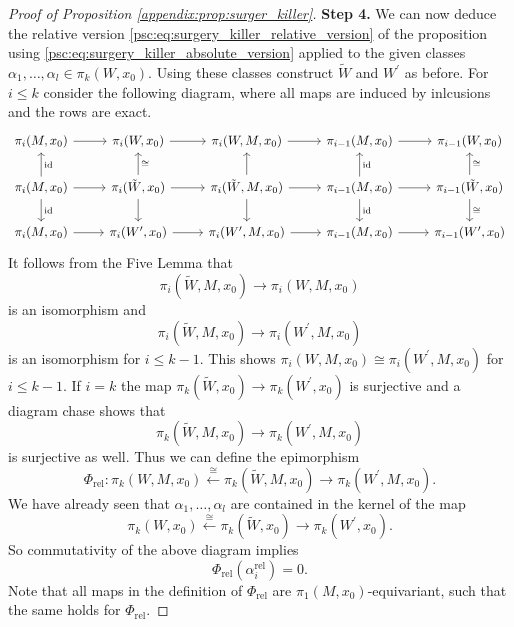 \begin{proof}[Proof of Proposition \ref{appendix:prop:surger_killer}]
    \noindent \textbf{Step 4.} We can now deduce the relative version \ref{psc:eq:surgery_killer_relative_version} of the proposition using \ref{psc:eq:surgery_killer_absolute_version} applied to the given classes $\alpha_1, \ldots, \alpha_l \in \pi_k(W,x_0)$. Using these classes construct $\tilde{W}$ and $W^\prime$ as before. For $i \leq k$ consider the following diagram, where all maps are induced by inlcusions and the rows are exact. 
    \[\begin{tikzcd}
	{\pi_i(M,x_0)} & {\pi_i(W,x_0)} & {\pi_i(W,M,x_0)} & {\pi_{i-1}(M,x_0)} & {\pi_{i-1}(W,x_0)} \\
	{\pi_i(M,x_0)} & {\pi_i(\tilde{W},x_0)} & {\pi_i(\tilde{W},M,x_0)} & {\pi_{i-1}(M,x_0)} & {\pi_{i-1}(\tilde{W},x_0)} \\
	{\pi_i(M,x_0)} & {\pi_i(W^\prime,x_0)} & {\pi_i(W^\prime,M,x_0)} & {\pi_{i-1}(M,x_0)} & {\pi_{i-1}(W^\prime,x_0)}
	\arrow[from=1-1, to=1-2]
	\arrow[from=1-2, to=1-3]
	\arrow[from=1-3, to=1-4]
	\arrow[from=1-4, to=1-5]
	\arrow["{\mathrm{id}}"', from=2-1, to=1-1]
	\arrow[from=2-1, to=2-2]
	\arrow["{\mathrm{id}}", from=2-1, to=3-1]
	\arrow["\cong"', from=2-2, to=1-2]
	\arrow[from=2-2, to=2-3]
	\arrow[from=2-2, to=3-2]
	\arrow[from=2-3, to=1-3]
	\arrow[from=2-3, to=2-4]
	\arrow[from=2-3, to=3-3]
	\arrow["{\mathrm{id}}"', from=2-4, to=1-4]
	\arrow[from=2-4, to=2-5]
	\arrow["{\mathrm{id}}", from=2-4, to=3-4]
	\arrow["\cong"', from=2-5, to=1-5]
	\arrow["\cong", from=2-5, to=3-5]
	\arrow[from=3-1, to=3-2]
	\arrow[from=3-2, to=3-3]
	\arrow[from=3-3, to=3-4]
	\arrow[from=3-4, to=3-5]
    \end{tikzcd}\]
    It follows from the Five Lemma that 
    \[
    \pi_i(\tilde{W},M,x_0) \to \pi_i(W,M,x_0)
    \] 
    is an isomorphism and 
    \[
    \pi_i(\tilde{W},M,x_0) \to \pi_i(W^\prime,M,x_0)
    \] 
    is an isomorphism for $i \leq k-1$. This shows $\pi_i(W,M,x_0) \cong \pi_i(W^\prime,M,x_0)$ for $i \leq k-1$. If $i = k$ the map $\pi_k(\tilde{W},x_0) \to \pi_k(W^\prime,x_0)$ is surjective and a diagram chase shows that 
    \[
    \pi_k(\tilde{W},M,x_0) \to \pi_k(W^\prime,M,x_0)
    \] 
    is surjective as well. Thus we can define the epimorphism
    \[
    \Phi_\mathrm{rel} \colon \pi_k(W,M,x_0) \xleftarrow{\cong} \pi_k(\tilde{W},M,x_0) \to \pi_k(W^\prime,M,x_0).
    \]
    We have already seen that $\alpha_1,\ldots,\alpha_l$ are contained in the kernel of the map 
    \[
    \pi_k(W,x_0) \xleftarrow{\cong} \pi_k(\tilde{W},x_0) \to \pi_k(W^\prime,x_0).
    \]
    So commutativity of the above diagram implies 
    \[
    \Phi_\mathrm{rel}(\alpha_i^\mathrm{rel}) = 0.
    \]
    Note that all maps in the definition of $\Phi_\mathrm{rel}$ are $\pi_1(M,x_0)$-equivariant, such that the same holds for $\Phi_\mathrm{rel}$.
\end{proof}

